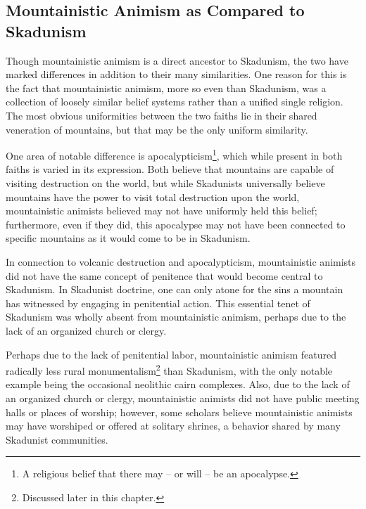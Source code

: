 \subsection{Mountainistic Animism as Compared to Skadunism}

Though mountainistic animism is a direct ancestor to Skadunism, the two have marked differences in addition to their many similarities. One reason for this is the fact that mountainistic animism, more so even than Skadunism, was a collection of loosely similar belief systems rather than a unified single religion. The most obvious uniformities between the two faiths lie in their shared veneration of mountains, but that may be the only uniform similarity. \par 

One area of notable difference is apocalypticism\footnote{A religious belief that there may -- or will -- be an apocalypse.}, which while present in both faiths is varied in its expression. Both believe that mountains are capable of visiting destruction on the world, but while Skadunists universally believe mountains have the power to visit total destruction upon the world, mountainistic animists believed may not have uniformly held this belief; furthermore, even if they did, this apocalypse may not have been connected to specific mountains as it would come to be in Skadunism.\par 

In connection to volcanic destruction and apocalypticism, mountainistic animists did not have the same concept of penitence that would become central to Skadunism. In Skadunist doctrine, one can only atone for the sins a mountain has witnessed by engaging in penitential action. This essential tenet of Skadunism was wholly absent from mountainistic animism, perhaps due to the lack of an organized church or clergy.\par 

Perhaps due to the lack of penitential labor, mountainistic animism featured radically less rural monumentalism\footnote{Discussed later in this chapter.} than Skadunism, with the only notable example being the occasional neolithic cairn complexes. Also, due to the lack of an organized church or clergy, mountainistic animists did not have public meeting halls or places of worship; however, some scholars believe mountainistic animists may have worshiped or offered at solitary shrines, a behavior shared by many Skadunist communities.\par 

